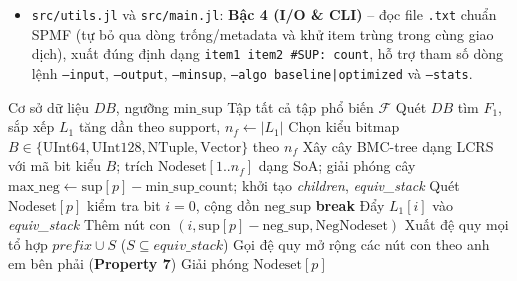 \documentclass[conference]{IEEEtran}
\begin{document}
\begin{itemize}
\begin{enumerate}
        \item \textbf{Bố cục Structure-of-Arrays (SoA) và \texttt{@inbounds}:} Tách \texttt{NodeSetOpt\{B\}} thành hai mảng phẳng liên tiếp \texttt{bitmaps::Vector\{B\}} và \texttt{counts::Vector\{Int32\}}, kết hợp tính sẵn mặt nạ bit (\textit{bit\_locator}) ngoài vòng lặp nóng giúp tối ưu bộ nhớ đệm CPU (cache locality).
        \item \textbf{Cắt sớm (\textit{Early-Abort Pruning}):} Trong vòng lặp lọc bit trích NegNodeset, cộng dồn ngay \textit{neg\_sup}; nếu $\text{neg\_sup} > \text{parent\_sup} - \text{min\_sup\_count}$ thì thoát vòng lặp lập tức (dòng 8--9, Thuật toán~\ref{alg:negfin}).
        \item \textbf{Xuất Promotion không cấp phát \textit{FIS\_parent}:} Thay vì lưu tập hợp \textit{FIS\_parent} có thể phình to theo hàm mũ, sử dụng hai ngăn xếp phẳng \textit{prefix} và \textit{equiv\_stack} cùng hàm callback streaming \texttt{emit\_fn}, đồng thời giải phóng sớm \texttt{nodesets[pos]} ngay sau khi duyệt xong từng nhánh tầng 1.
    \end{enumerate}
    \item \texttt{src/utils.jl} và \texttt{src/main.jl}: \textbf{Bậc 4 (I/O \& CLI)} -- đọc file \texttt{.txt} chuẩn SPMF (tự bỏ qua dòng trống/metadata và khử item trùng trong cùng giao dịch), xuất đúng định dạng \texttt{item1 item2 \#SUP: count}, hỗ trợ tham số dòng lệnh \texttt{--input}, \texttt{--output}, \texttt{--minsup}, \texttt{--algo baseline|optimized} và \texttt{--stats}.
\end{itemize}

\begin{algorithm}[H]
\caption{Khung thuật toán negFIN (phiên bản tối ưu)}
\label{alg:negfin}
\begin{algorithmic}[1]
\REQUIRE Cơ sở dữ liệu $DB$, ngưỡng $\text{min\_sup}$
\ENSURE Tập tất cả tập phổ biến $\mathcal{F}$
\STATE Quét $DB$ tìm $F_1$, sắp xếp $L_1$ tăng dần theo support, $n_f \leftarrow |L_1|$
\STATE Chọn kiểu bitmap $B \in \{\text{UInt64}, \text{UInt128}, \text{NTuple}, \text{Vector}\}$ theo $n_f$
\STATE Xây cây BMC-tree dạng LCRS với mã bit kiểu $B$; trích $\text{Nodeset}[1..n_f]$ dạng SoA; giải phóng cây
    \STATE $\text{max\_neg} \leftarrow \text{sup}[p] - \text{min\_sup\_count}$; khởi tạo \textit{children}, \textit{equiv\_stack}
        \STATE Quét $\text{Nodeset}[p]$ kiểm tra bit $i = 0$, cộng dồn $\text{neg\_sup}$
            \STATE \textbf{break} 
        \ENDIF
            \STATE Đẩy $L_1[i]$ vào \textit{equiv\_stack} 
        \ELSE
            \STATE Thêm nút con $(i, \text{sup}[p] - \text{neg\_sup}, \text{NegNodeset})$
        \ENDIF
    \ENDFOR
    \STATE Xuất đệ quy mọi tổ hợp $\mathit{prefix} \cup S$ ($S \subseteq \mathit{equiv\_stack}$)
    \STATE Gọi đệ quy mở rộng các nút con theo anh em bên phải (\textbf{Property 7})
    \STATE Giải phóng $\text{Nodeset}[p]$
\ENDFOR
\end{algorithmic}
\end{algorithm}
\end{document}
